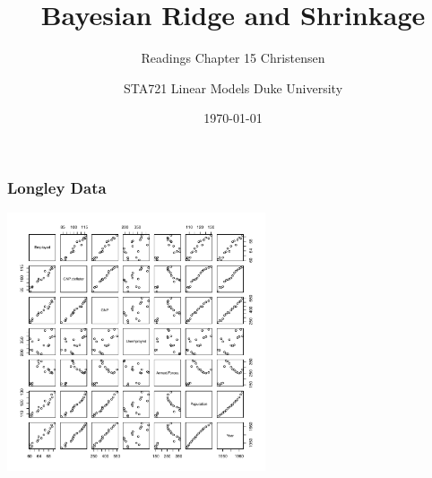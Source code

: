 \documentclass[handout]{beamer}\usepackage[]{graphicx}\usepackage[]{color}
\title{Bayesian Ridge and Shrinkage}
\subtitle{Readings Chapter 15 Christensen}
\institute{Merlise Clyde}
\author{STA721 Linear Models Duke University}
\date{\today}
\begin{document}
\maketitle

\begin{frame}
  \frametitle{Longley Data}
  \centerline{\includegraphics[height=3in]{longley-pairs}}
\end{frame}
\end{document}
